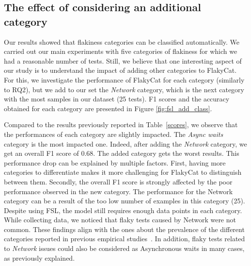 


\subsection{The effect of considering an additional category}
Our results showed that flakiness categories can be classified automatically. We carried out our main experiments with five categories of flakiness for which we had a reasonable number of tests. Still, we believe that one interesting aspect of our study is to understand the impact of adding other categories to FlakyCat. 
For this, we investigate the performance of FlakyCat for each category (similarly to RQ2), but we add to our set the \textit{Network} category,
which is the next category with the most samples in our dataset (25 tests). F1 scores and the accuracy obtained for each category are presented in Figure \ref{fig:fsl_add_class}. 

Compared to the results previously reported in Table~\ref{scores}, we observe that the performances of each category are slightly impacted.
The \textit{Async waits} category is the most impacted one. 
Indeed, after adding the \textit{Network} category, we get an overall F1 score of 0.68. The added category gets the worst results. 
This performance drop can be explained by multiple factors.
First, having more categories to differentiate makes it more challenging for FlakyCat to distinguish between them.
Secondly, the overall F1 score is strongly affected by the poor performance observed in the new category.
The performance for the Network category can be a result of the too low number of examples in this category (25). Despite using FSL, the model still requires enough data points in each category. While collecting data, we noticed that flaky tests caused by Network were not common. These findings align with the ones about the prevalence of the different categories reported in previous empirical studies~\cite{Luo2014,Eck2019}. In addition, flaky tests related to \textit{Network} issues could also be considered as Asynchronous waits in many cases, as previously explained. 


